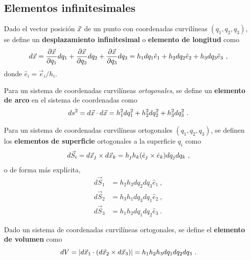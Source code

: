\newpage

\subsection{Elementos infinitesimales}

\begin{defi}
    Dado el vector posición $\vec{x}$ de un punto con coordenadas curvilíneas $(q_1, q_2, q_3)$, se define un \textbf{desplazamiento infinitesimal} o \textbf{elemento de longitud} como 
    \begin{equation}
        d\vec{x} = \frac{\partial \vec{x}}{\partial q_1} dq_1 + \frac{\partial \vec{x}}{\partial q_2} dq_2 + \frac{\partial \vec{x}}{\partial q_3} dq_3 = h_1 dq_1 \hat{e}_1 + h_2 dq_2 \hat{e}_2 + h_3 dq_3 \hat{e}_3 \ ,
    \end{equation}
    donde $\hat{e}_i = \vec{e}_i / h_i$.
\end{defi}

\begin{defi}
    Para un sistema de coordenadas curvilíneas \emph{ortogonales}, se define un \textbf{elemento de arco} en el sistema de coordenadas como 
    \begin{equation}
        ds^2 = d\vec{x} \cdot d\vec{x} = h_1^2 dq_1^2 + h_2^2 dq_2^2 + h_3^2 dq_3^2 \ .
    \end{equation}
\end{defi}

\begin{defi}
    Para un sistema de coordenadas curvilíneas ortogonales $(q_1, q_2, q_3)$, se definen los \textbf{elementos de superficie} ortogonales a la superficie $q_i$ como 
    \begin{equation}
        d\vec{S}_i = d\vec{x}_j \times d\vec{x}_k = h_j h_k (\hat{e}_j \times \hat{e}_k) dq_j dq_k \ ,
    \end{equation}
    o de forma más explícita, 
    \begin{align*}
        d\vec{S}_1 & = h_2 h_3 dq_2 dq_3 \hat{e}_1 \ , \\
        d\vec{S}_2 & = h_3 h_1 dq_3 dq_1 \hat{e}_2 \ , \\
        d\vec{S}_3 & = h_1 h_2 dq_1 dq_2 \hat{e}_3 \ .
    \end{align*}
\end{defi}

\begin{defi}
    Dado un sistema de coordenadas curvilíneas ortogonales, se define el \textbf{elemento de volumen} como 
    \begin{equation}
        dV = \left| d\vec{x}_1 \cdot (d\vec{x}_2 \times d\vec{x}_3) \right| = h_1 h_2 h_3 dq_1 dq_2 dq_3 \ .
    \end{equation}
\end{defi}

